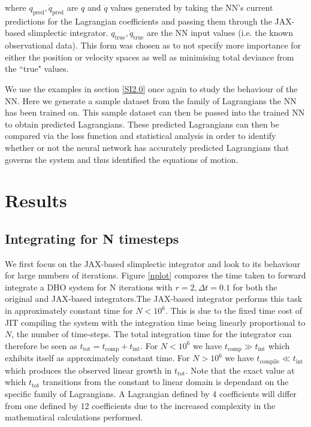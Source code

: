 \documentclass[10pt]{iopart}
\begin{document}
where $q_{\textrm{pred}}, \dot{q}_{\textrm{pred}}$ are $q$ and $\dot q$ values generated by taking the NN's current predictions for the Lagrangian coefficients and passing them through the JAX-based slimplectic integrator. $q_{\textrm{true}}, \dot{q}_{\textrm{true}}$ are the NN input values (i.e. the known observational data). This form was chosen as to not specify more importance for either the position or velocity spaces as well as minimising total deviance from the ``true" values.

We use the examples in section \ref{SI2.0} once again to study the behaviour of the NN. Here we generate a sample dataset from the family of Lagrangians the NN has been trained on. This sample dataset can then be passed into the trained NN to obtain predicted Lagrangians. These predicted Lagrangians can then be compared via the loss function and statistical analysis in order to identify whether or not the neural network has accurately predicted Lagrangians that governs the system and thus identified the equations of motion.

\section{Results}
\subsection{Integrating for N timesteps}
We first focus on the JAX-based slimplectic integrator and look to its behaviour for large numbers of iterations. Figure \ref{nplot} compares the time taken to forward integrate a DHO system for N iterations with $r=2, \Delta t = 0.1$ for both the original and JAX-based integrators.The JAX-based integrator performs this task in approximately constant time for $N<10^6$. This is due to the fixed time cost of JIT compiling the system with the integration time being linearly proportional to $N$, the number of time-steps. The total integration time for the integrator can therefore be seen as $t_{\textrm{tot}} = t_{\textrm{comp}} + t_{\textrm{int}}$. For $N<10^6$ we have $t_{\textrm{comp}} \gg t_{\textrm{int}}$ which exhibits itself as approximately constant time. For $N > 10^6$ we have $t_{\textrm{compile}} \ll t_{\textrm{int}}$ which produces the observed linear growth in $t_{\textrm{tot}}$.
Note that the exact value at which $t_{\textrm{tot}}$ transitions from the constant to linear domain is dependant on the specific family of Lagrangians. A Lagrangian defined by 4 coefficients will differ from one defined by 12 coefficients due to the increased complexity in the mathematical calculations performed.
\end{document}
